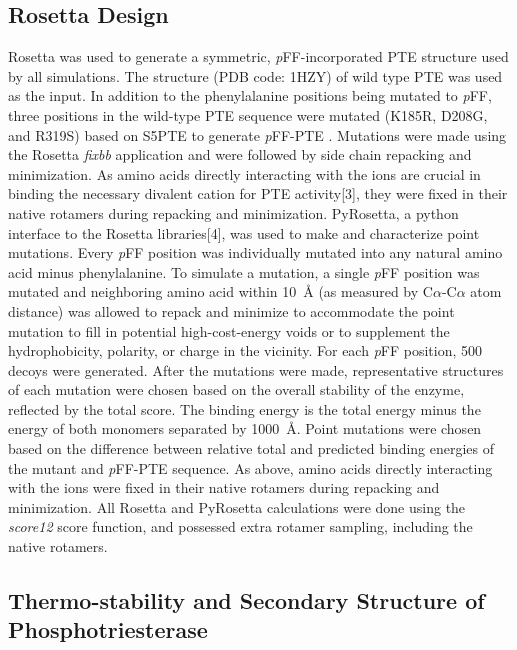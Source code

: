 \begin{refsection}
\subsection{Rosetta Design}
\label{sec:pyrosetta-method}

Rosetta\cite{Leaver-Fay2011,DiMaio2011a} was used to generate a symmetric,
\emph{p}FF-incorporated PTE structure used by all simulations. The structure
(PDB code: 1HZY) of wild type PTE was used as the input. In addition to the
phenylalanine positions being mutated to \emph{p}FF, three positions in the
wild-type PTE sequence were mutated (K185R, D208G, and R319S) based on S5PTE to
generate \emph{p}FF-PTE \cite{Roodveldt2005}. Mutations were made using the
Rosetta \emph{fixbb} application and were followed by side chain repacking and
minimization. As amino acids directly interacting with the  ions
are crucial in binding the necessary divalent cation for PTE activity[3], 
they were fixed in their native rotamers during repacking and minimization.
PyRosetta, a python interface to the Rosetta libraries[4], was used to make and
characterize point mutations. Every \emph{p}FF position was individually
mutated into any natural amino acid minus phenylalanine. To simulate a
mutation, a single \emph{p}FF position was mutated and neighboring amino acid
within \SI{10}{\angstrom} (as measured by C$\alpha$-C$\alpha$ atom distance) was
allowed to repack and minimize to accommodate the point mutation to fill in
potential high-cost-energy voids or to supplement the hydrophobicity, polarity,
or charge in the vicinity. For each \emph{p}FF position, 500 decoys were
generated. After the mutations were made, representative structures of each
mutation were chosen based on the overall stability of the enzyme, reflected by
the total score. The binding energy is the total energy minus the energy of
both monomers separated by \SI{1000}{\angstrom}. Point mutations were chosen based on
the difference between relative total and predicted binding energies of the
mutant and \emph{p}FF-PTE sequence. As above, amino acids directly interacting
with the  ions were fixed in their native rotamers during repacking
and minimization. All Rosetta and PyRosetta calculations were done using the
\emph{score12} score function, and possessed extra rotamer sampling, including
the native rotamers.

\subsection{Thermo-stability and Secondary Structure of Phosphotriesterase}
\label{sec:thermo}


\end{refsection}
